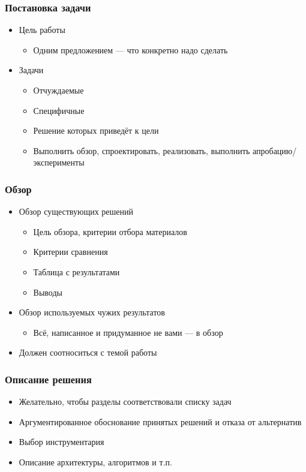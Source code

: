 \documentclass{../../slides-style}
\begin{document}
    \begin{frame}
        \frametitle{Постановка задачи}
        \begin{itemize}
            \item Цель работы
            \begin{itemize}
                \item Одним предложением --- что конкретно надо сделать
            \end{itemize}
            \item Задачи
            \begin{itemize}
                \item Отчуждаемые
                \item Специфичные
                \item Решение которых приведёт к цели
                \item Выполнить обзор, спроектировать, реализовать, выполнить апробацию/эксперименты
            \end{itemize}
        \end{itemize}
    \end{frame}

    \begin{frame}
        \frametitle{Обзор}
        \begin{itemize}
            \item Обзор существующих решений
            \begin{itemize}
                \item Цель обзора, критерии отбора материалов
                \item Критерии сравнения
                \item Таблица с результатами
                \item Выводы
            \end{itemize}
            \item Обзор используемых чужих результатов
            \begin{itemize}
                \item Всё, написанное и придуманное не вами --- в обзор
            \end{itemize}
            \item Должен соотноситься с темой работы
        \end{itemize}
    \end{frame}

    \begin{frame}
        \frametitle{Описание решения}
        \begin{itemize}
            \item Желательно, чтобы разделы соответствовали списку задач
            \item Аргументированное обоснование принятых решений и отказа от альтернатив
            \item Выбор инструментария
            \item Описание архитектуры, алгоритмов и т.п.
        \end{itemize}
    \end{frame}
\end{document}
